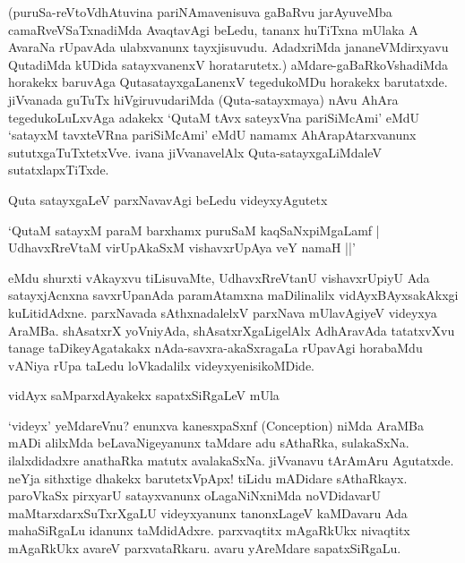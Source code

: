 (puruSa-reVtoVdhAtuvina pariNAmavenisuva gaBaRvu jarAyuveMba camaRveVSaTxnadiMda AvaqtavAgi beLedu, tananx huTiTxna mUlaka A AvaraNa rUpavAda ulabxvanunx tayxjisuvudu. AdadxriMda jananeVMdirxyavu QutadiMda kUDida satayxvanenxV horatarutetx.) aMdare-gaBaRkoVshadiMda horakekx baruvAga QutasatayxgaLanenxV tegedukoMDu horakekx barutatxde. jiVvanada guTuTx hiVgiruvudariMda (Quta-satayxmaya) nAvu AhAra tegedukoLuLxvAga adakekx `QutaM tAvx sateyxVna pariSiMcAmi' eMdU `satayxM tavxteVRna pariSiMcAmi' eMdU namamx AhArapAtarxvanunx sututxgaTuTxtetxVve. ivana jiVvanavelAlx Quta-satayxgaLiMdaleV sutatxlapxTiTxde.

Quta satayxgaLeV parxNavavAgi beLedu videyxyAgutetx

\begin{shloka}
`QutaM satayxM paraM barxhamx puruSaM kaqSaNxpiMgaLamf |\\
UdhavxRreVtaM virUpAkaSxM vishavxrUpAya veY namaH ||'
\end{shloka}

eMdu shurxti vAkayxvu tiLisuvaMte, UdhavxRreVtanU vishavxrUpiyU Ada satayxjAcnxna savxrUpanAda paramAtamxna maDilinalilx vidAyxBAyxsakAkxgi kuLitidAdxne. parxNavada sAthxnadalelxV parxNava mUlavAgiyeV videyxya AraMBa. shAsatxrX yoVniyAda, shAsatxrXgaLigelAlx AdhAravAda tatatxvXvu tanage taDikeyAgatakakx nAda-savxra-akaSxragaLa rUpavAgi horabaMdu vANiya rUpa taLedu loVkadalilx videyxyenisikoMDide.

vidAyx saMparxdAyakekx sapatxSiRgaLeV mUla

`videyx' yeMdareVnu? enunxva kanesxpaSxnf ({\rm Conception}) niMda AraMBa mADi alilxMda beLavaNigeyanunx taMdare adu sAthaRka, sulakaSxNa. ilalxdidadxre anathaRka matutx avalakaSxNa. jiVvanavu tArAmAru Agutatxde. neYja sithxtige dhakekx barutetxVpApx! tiLidu mADidare sAthaRkayx. paroVkaSx pirxyarU satayxvanunx oLagaNiNxniMda noVDidavarU maMtarxdarxSuTxrXgaLU videyxyanunx tanonxLageV kaMDavaru Ada mahaSiRgaLu idanunx taMdidAdxre. parxvaqtitx mAgaRkUkx nivaqtitx mAgaRkUkx avareV parxvataRkaru. avaru yAreMdare sapatxSiRgaLu.

